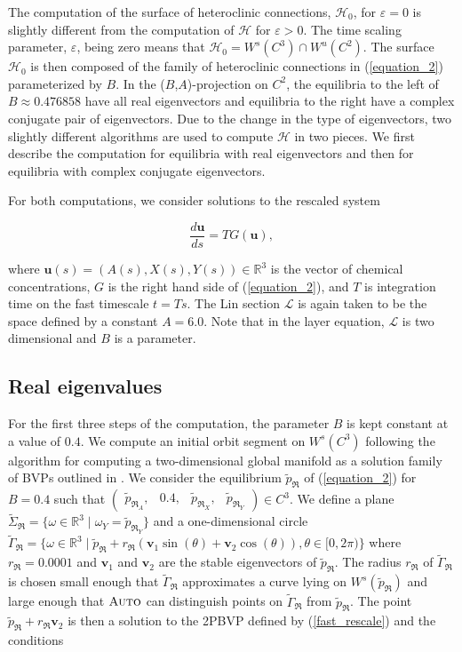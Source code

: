 \documentclass{ws-ijbc}
\begin{document}
The computation of the surface of heteroclinic connections, $\mathscr{H}_0$, for $\varepsilon=0$ is slightly different from the computation of $\mathscr{H}$ for $\varepsilon > 0$.  The time scaling parameter, $\varepsilon$, being zero means that $\mathscr{H}_0 = W^s(C^3) \cap W^u(C^2)$.  The surface $\mathscr{H}_0$ is then composed of the family of heteroclinic connections in (\ref{equation_2}) parameterized by $B$.  In the ($B$,$A$)-projection on $C^2$, the equilibria to the left of $B \approx 0.476858$ have all real eigenvectors and equilibria to the right have a complex conjugate pair of eigenvectors.  Due to the change in the type of eigenvectors, two slightly different algorithms are used to compute $\mathscr{H}$ in two pieces.  We first describe the computation for equilibria with real eigenvectors and then for equilibria with complex conjugate eigenvectors.  

For both computations, we consider solutions to the rescaled system

\begin{equation}
\frac{d\mathbf{u}}{ds} = TG(\mathbf{u}),
\label{fast_rescale}
\end{equation}

\noindent
where $\mathbf{u}(s) = (A(s), X(s), Y(s)) \in \mathbb{R}^3$ is the vector of chemical concentrations, $G$ is the right hand side of (\ref{equation_2}), and $T$ is integration time on the fast timescale $t=Ts$.  The Lin section $\mathscr{L}$ is again taken to be the space defined by a constant $A=6.0$.  Note that in the layer equation, $\mathscr{L}$ is two dimensional and $B$ is a parameter.

\subsection{Real eigenvalues}

For the first three steps of the computation, the parameter $B$ is kept constant at a value of $0.4$.  We compute an initial orbit segment on $W^{s}(C^3)$ following the algorithm for computing a two-dimensional global manifold as a solution family of BVPs outlined in \cite{Red_book}.  We consider the equilibrium $\tilde{p}_{\Re}$ of (\ref{equation_2}) for $B=0.4$ such that $\begin{pmatrix} \tilde{p}_{\Re_A},& 0.4,&\tilde{p}_{\Re_X},&\tilde{p}_{\Re_Y} \end{pmatrix} \in C^3$.  We define a plane $\widetilde{\Sigma}_{\Re} = \{ \omega \in \mathbb{R}^3  \; | \; \omega_Y = \tilde{p}_{\Re_Y} \}$ and a one-dimensional circle $\widetilde{\Gamma}_{\Re}= \{ \omega \in \mathbb{R}^3  \; | \; \tilde{p}_{\Re} + r_{\Re}(\mathbf{v}_1\sin(\theta) + \mathbf{v}_2\cos(\theta)), \theta \in [0,2\pi) \}$  where $r_{\Re}=0.0001$ and $\mathbf{v}_1$ and $\mathbf{v}_2$ are the stable eigenvectors of $\tilde{p}_{\Re}$.  The radius $r_{\Re}$ of $\widetilde{\Gamma}_{\Re}$ is chosen small enough that $\widetilde{\Gamma}_{\Re}$ approximates a curve lying on $W^{s}(\tilde{p}_{\Re})$ and large enough that $\textsc{Auto}$ can distinguish points on $\widetilde{\Gamma}_{\Re}$ from $\tilde{p}_{\Re}$.  The point $\tilde{p}_{\Re} + r_{\Re}\mathbf{v}_2$ is then a solution to the 2PBVP defined by (\ref{fast_rescale}) and the conditions
\end{document}
